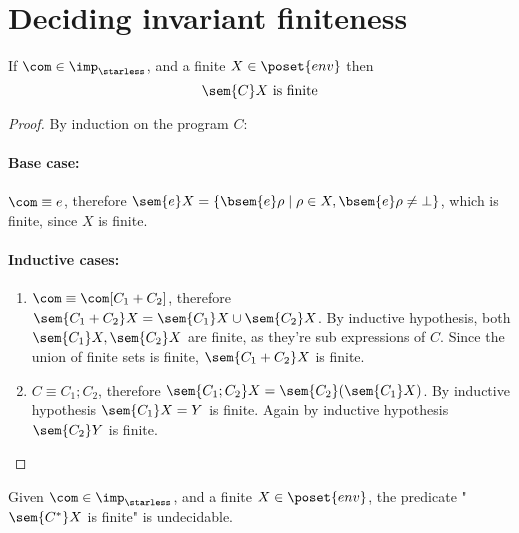 \section{Deciding invariant finiteness}

\begin{lemma}\label{le:finiteness}
  If \(\com\in\imp_\starless\), and a finite \(X \in \poset{env}\)
  then \[\sem{C}X \text{ is finite}\]
\end{lemma}

\begin{proof}
  By induction on the program \(C\):
  \paragraph*{Base case:\\}
  \(\com \equiv e\), therefore \(\sem{e}X = \{\bsem{e}\rho \mid \rho
  \in X , \bsem{e}\rho \neq \bot\}\), which is finite, since \(X\) is
  finite.
  
  \paragraph*{Inductive cases:\\}
  \begin{enumerate}
  \item \(\com\equiv \com[C_1 + C_2]\), therefore \(\sem{C_1 + C_2} X =
    \sem{C_1}X \cup \sem{C_2}X\). By inductive hypothesis, both
    \(\sem{C_1}X, \sem{C_2}X\) are finite, as they're sub expressions
    of \(C\). Since the union of finite sets is finite, \(\sem{C_1 +
      C_2}X\) is finite.
  \item \(C\equiv C_1; C_2\), therefore \(\sem{C_1;C_2}X =
    \sem{C_2}(\sem{C_1}X)\). By inductive hypothesis \(\sem{C_1}X =
    Y\) is finite. Again by inductive hypothesis \(\sem{C_2}Y\) is
    finite.
  \end{enumerate}
\end{proof}

\begin{lemma}\label{le:infiniteness}
  Given \(\com\in\imp_\starless\), and a finite \(X \in \poset{env}\),
  the predicate "\(\sem{C^*}X\) is finite" is undecidable.
\end{lemma}

